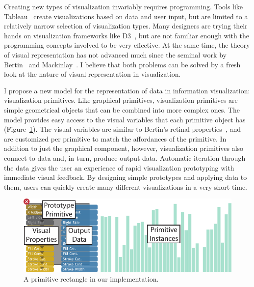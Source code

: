 \label{Intro}

Creating new types of visualization invariably requires programming.
Tools like Tableau~\cite{stolte2002polaris} create visualizations based on data and user input, but are limited to a relatively narrow selection of visualization types.
Many designers are trying their hands on visualization frameworks like D3~\cite{bostock2011d3}, but are not familiar enough with the programming concepts involved to be very effective.
At the same time, the theory of visual representation has not advanced much since the seminal work by Bertin~\cite{bertin1983semiology} and Mackinlay~\cite{Mackinlay1986}.
I believe that both problems can be solved by a fresh look at the nature of visual representation in visualization.

I propose a new model for the representation of data in information visualization: visualization primitives.
Like graphical primitives, visualization primitives are simple geometrical objects that can be combined into more complex ones.
The model provides easy access to the visual variables that each primitive object has (Figure~\ref{fig:primitive}).
The visual variables are similar to Bertin's retinal properties~\cite{bertin1983semiology}, and are customized per primitive to match the affordances of the primitive.
In addition to just the graphical component, however, visualization primitives also connect to data and, in turn, produce output data.
Automatic iteration through the data gives the user an experience of rapid visualization prototyping with immediate visual feedback.
By designing simple prototypes and applying data to them, users can quickly create many different visualizations in a very short time.

\begin{figure}[t]
\centering
\includegraphics[width=\textwidth]{images/primitive.pdf}
\caption{A primitive rectangle in our implementation.}
\label{fig:primitive}
\end{figure}

